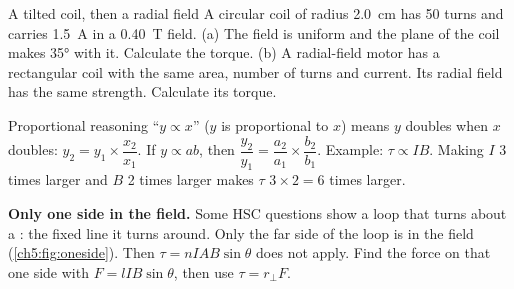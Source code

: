 \begin{workedexample}{A tilted coil, then a radial field}\label{ch5:we:tilted}
A circular coil of radius \qty{2.0}{cm} has 50 turns and carries \qty{1.5}{A} in a
\qty{0.40}{T} field. (a) The field is uniform and the plane of the coil makes \ang{35}
with it. Calculate the torque. (b) A radial-field motor has a rectangular coil with the
same area, number of turns and current. Its radial field has the same strength.
Calculate its torque.
\end{workedexample}

\begin{toolkit}{Proportional reasoning}
``$y \propto x$'' ($y$ is proportional to $x$) means $y$ doubles when $x$ doubles:
$y_2 = y_1 \times \dfrac{x_2}{x_1}$. If $y \propto ab$, then
$\dfrac{y_2}{y_1} = \dfrac{a_2}{a_1} \times \dfrac{b_2}{b_1}$. Example: $\tau \propto IB$.
Making $I$ 3 times larger and $B$ 2 times larger makes $\tau$ $3 \times 2 = 6$ times larger.
\end{toolkit}

\textbf{Only one side in the field.} Some HSC questions show a loop that turns about a
: the fixed line it turns around. Only the far side of the loop is in the
field (\cref{ch5:fig:oneside}). Then $\tau = nIAB\sin\theta$ does not apply. Find the
force on that one side with $F = lIB\sin\theta$, then use $\tau = r_\perp F$.

